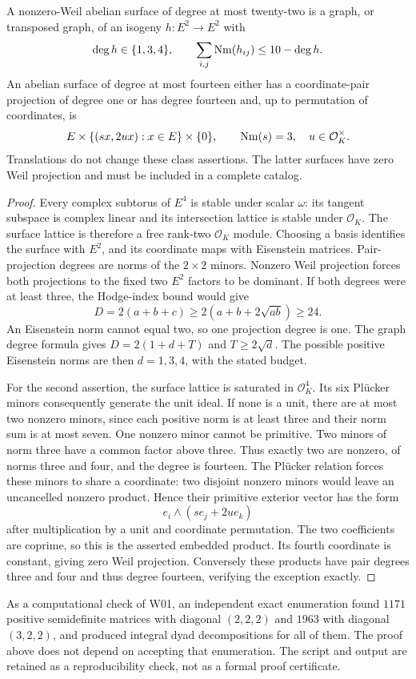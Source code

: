 \begin{proposition}[W03]
A nonzero-Weil abelian surface of degree at most twenty-two is a graph, or transposed graph, of an isogeny $h:E^2\to E^2$ with
\[
\deg h\in\{1,3,4\},\qquad
\sum_{i,j}\operatorname{Nm}(h_{ij})\leq10-\deg h.
\]
An abelian surface of degree at most fourteen either has a coordinate-pair projection of degree one or has degree fourteen and, up to permutation of coordinates, is
\[
E\times\{(s x,2u x):x\in E\}\times\{0\},
\qquad \operatorname{Nm}(s)=3,\quad u\in\mathcal O_K^\times.
\]
Translations do not change these class assertions. The latter surfaces have zero Weil projection and must be included in a complete catalog.
\end{proposition}

\begin{proof}
Every complex subtorus of $E^4$ is stable under scalar $\omega$: its tangent subspace is complex linear and its intersection lattice is stable under $\mathcal O_K$. The surface lattice is therefore a free rank-two $\mathcal O_K$ module. Choosing a basis identifies the surface with $E^2$, and its coordinate maps with Eisenstein matrices. Pair-projection degrees are norms of the $2\times2$ minors. Nonzero Weil projection forces both projections to the fixed two $E^2$ factors to be dominant. If both degrees were at least three, the Hodge-index bound would give
\[
D=2(a+b+c)\geq2(a+b+2\sqrt{ab})\geq24.
\]
An Eisenstein norm cannot equal two, so one projection degree is one. The graph degree formula gives $D=2(1+d+T)$ and $T\geq2\sqrt d$. The possible positive Eisenstein norms are then $d=1,3,4$, with the stated budget.

For the second assertion, the surface lattice is saturated in $\mathcal O_K^4$. Its six Pl\"ucker minors consequently generate the unit ideal. If none is a unit, there are at most two nonzero minors, since each positive norm is at least three and their norm sum is at most seven. One nonzero minor cannot be primitive. Two minors of norm three have a common factor above three. Thus exactly two are nonzero, of norms three and four, and the degree is fourteen. The Pl\"ucker relation forces these minors to share a coordinate: two disjoint nonzero minors would leave an uncancelled nonzero product. Hence their primitive exterior vector has the form
\[
e_i\wedge(s e_j+2u e_k)
\]
after multiplication by a unit and coordinate permutation. The two coefficients are coprime, so this is the asserted embedded product. Its fourth coordinate is constant, giving zero Weil projection. Conversely these products have pair degrees three and four and thus degree fourteen, verifying the exception exactly.
\end{proof}

As a computational check of W01, an independent exact enumeration found $1171$ positive semidefinite matrices with diagonal $(2,2,2)$ and $1963$ with diagonal $(3,2,2)$, and produced integral dyad decompositions for all of them. The proof above does not depend on accepting that enumeration. The script and output are retained as a reproducibility check, not as a formal proof certificate.
